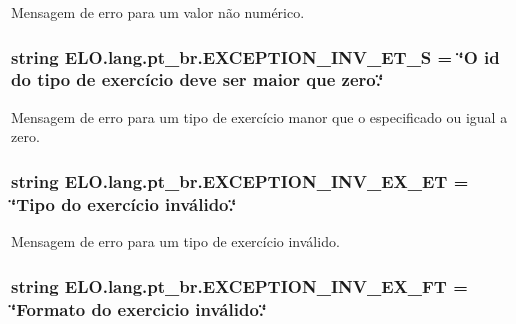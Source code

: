 Mensagem de erro para um valor não numérico. 

\hypertarget{namespaceELO_1_1lang_1_1pt__br_acd9ea5df1a26bfe4f7341fa58bfc9e2b}{
\subsubsection[{E\-X\-C\-E\-P\-T\-I\-O\-N\-\_\-\-I\-N\-V\-\_\-\-E\-T\-\_\-\-S}]{\setlength{\rightskip}{0pt plus 5cm}string E\-L\-O.\-lang.\-pt\-\_\-br.\-E\-X\-C\-E\-P\-T\-I\-O\-N\-\_\-\-I\-N\-V\-\_\-\-E\-T\-\_\-\-S = \char`\"{}O id do tipo de exercício deve ser maior que zero.\char`\"{}}}\label{d5/d70/namespaceELO_1_1lang_1_1pt__br_acd9ea5df1a26bfe4f7341fa58bfc9e2b}


Mensagem de erro para um tipo de exercício manor que o especificado ou igual a zero. 

\hypertarget{namespaceELO_1_1lang_1_1pt__br_a9094729b169752160fa1dc35eb24396c}{
\subsubsection[{E\-X\-C\-E\-P\-T\-I\-O\-N\-\_\-\-I\-N\-V\-\_\-\-E\-X\-\_\-\-E\-T}]{\setlength{\rightskip}{0pt plus 5cm}string E\-L\-O.\-lang.\-pt\-\_\-br.\-E\-X\-C\-E\-P\-T\-I\-O\-N\-\_\-\-I\-N\-V\-\_\-\-E\-X\-\_\-\-E\-T = \char`\"{}Tipo do exercício inválido.\char`\"{}}}\label{d5/d70/namespaceELO_1_1lang_1_1pt__br_a9094729b169752160fa1dc35eb24396c}


Mensagem de erro para um tipo de exercício inválido. 

\hypertarget{namespaceELO_1_1lang_1_1pt__br_a835074107c62868614d30f665fef7ae8}{
\subsubsection[{E\-X\-C\-E\-P\-T\-I\-O\-N\-\_\-\-I\-N\-V\-\_\-\-E\-X\-\_\-\-F\-T}]{\setlength{\rightskip}{0pt plus 5cm}string E\-L\-O.\-lang.\-pt\-\_\-br.\-E\-X\-C\-E\-P\-T\-I\-O\-N\-\_\-\-I\-N\-V\-\_\-\-E\-X\-\_\-\-F\-T = \char`\"{}Formato do exercicio inválido.\char`\"{}}}\label{d5/d70/namespaceELO_1_1lang_1_1pt__br_a835074107c62868614d30f665fef7ae8}


